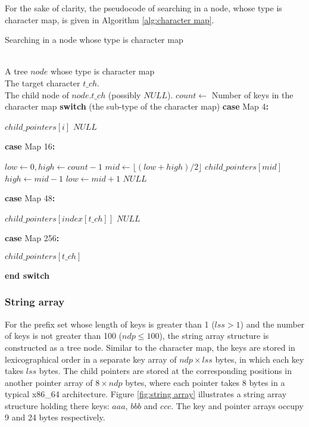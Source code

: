 \documentclass{article}
\makeatletter
\newcommand{\SWITCH}[1]{\STATE \textbf{switch} (#1)}
\newcommand{\ENDPWITCH}{\STATE \textbf{end switch}}
\newcommand{\CASE}[1]{\STATE \textbf{case} #1\textbf{:} \begin{ALC@g}}
\newcommand{\ENDCASE}{\end{ALC@g}}
\makeatother
\begin{document}
For the sake of clarity, the pseudocode of searching in a node, whose
type is character map, is given in Algorithm \ref{alg:character map}.

\begin{algorithm}
  \caption{Searching in a node whose type is character map}\scriptsize
  \label{alg:character map}
  \begin{algorithmic}[1]
    \REQUIRE ~~\\
    A tree $node$ whose type is character map\\
    The target character $t\_ch$.
    \ENSURE ~~\\
    The child node of $node.t\_ch$ (possibly $NULL$).
    \STATE
    \STATE $count \leftarrow$ Number of keys in the character map
    \STATE
    \SWITCH{the sub-type of the character map}
    \CASE{\textsf{Map 4}}
    \RETURN $child\_pointers[i]$
    \ENDIF
    \ENDFOR
    \RETURN $NULL$
    \ENDCASE
    \STATE
    \CASE{\textsf{Map 16}}
    \STATE $low \leftarrow 0, high \leftarrow count-1$
    \STATE $mid \leftarrow \lfloor (low+high)/2 \rfloor$
    \RETURN $child\_pointers[mid]$
    \STATE $high \leftarrow mid-1$
    \ELSE
    \STATE $low \leftarrow mid+1$
    \ENDIF
    \ENDWHILE
    \RETURN $NULL$
    \ENDCASE
    \STATE
    \CASE{\textsf{Map 48}}
    \RETURN $child\_pointers[index[t\_ch]]$
    \ELSE
    \RETURN $NULL$
    \ENDIF
    \ENDCASE
    \STATE
    \CASE{\textsf{Map 256}}
    \RETURN $child\_pointers[t\_ch]$
    \ENDCASE
    \ENDPWITCH
  \end{algorithmic}
\end{algorithm}

\subsubsection{String array}
\label{sec:string array}

For the prefix set whose length of keys is greater than 1 ($lss > 1$)
and the number of keys is not greater than 100 ($ndp \leq 100$), the
\textsf{string array} structure is constructed as a tree node. Similar
to the character map, the keys are stored in lexicographical order in
a separate key array of $ndp \times lss$ bytes, in which each key
takes $lss$ bytes. The child pointers are stored at the corresponding
positions in another pointer array of $8 \times ndp$ bytes, where each
pointer takes 8 bytes in a typical x86\_64 architecture. Figure
\ref{fig:string array} illustrates a string array structure holding
there keys: $aaa$, $bbb$ and $ccc$. The key and pointer arrays occupy
9 and 24 bytes respectively.
\end{document}
